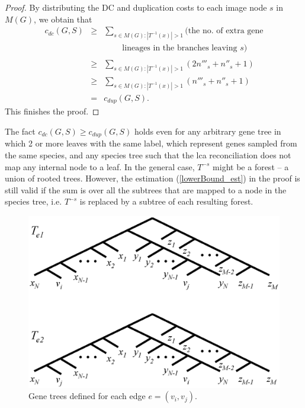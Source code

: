 \documentclass[9.5pt,journal,letterpaper,compsoc]{IEEEtran}
\begin{document}
\begin{proof}
By distributing the DC and duplication costs to each image node $s$ in
$M(G)$, we obtain
that
 \begin{eqnarray}
     c_{dc}(G, S)
 & \geq  & \sum_{s\in M(G) : |T^{-1}(x)|>1}
    (\mbox{the no. of extra gene} \nonumber\\
 & & \;\;\;\;\;\;\;\;  \mbox{lineages in the branches leaving $s$}) \nonumber \\
\nonumber\\
   & \geq &  \sum_{s\in M(G) : |T^{-1}(x)|>1}  \left(2n'''_s+n''_s+1\right)
\nonumber \\
   & \geq &  \sum_{s\in M(G) : |T^{-1}(x)|>1}  \left(n'''_s+n''_s+1\right)
\nonumber \\
   & =& c_{dup}(G, S). \label{lowerBound_est}
\end{eqnarray}
This finishes the proof.
\end{proof}
\vspace{1em}

 The fact $c_{dc}(G, S)\geq c_{dup}(G, S)$
holds even for any arbitrary gene tree in which 2 or more leaves
with the same label, which represent genes sampled from the same
species, and any species tree such that the lca reconciliation does
not map any internal node to a leaf. In the general case, $T^{-s}$
might be a forest -- a union of rooted trees. However, the
estimation (\ref{lowerBound_est}) in the proof is still valid if the
sum is over all the subtrees that are mapped to a node in the
species tree, i.e.  $T^{-s}$ is replaced by a subtree of each
resulting forest.

\begin{figure}[b!]
\begin{center}
\includegraphics[width=0.9\columnwidth]{Figure3}
\end{center}
\caption{Gene trees defined for each edge $e=(v_i, v_j)$.}
\label{EdgeTrees}
\end{figure}
\end{document}
